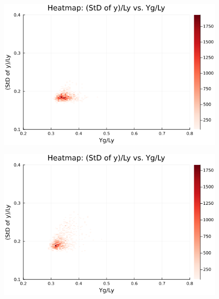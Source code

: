 \begin{figure}[H]
  \centering
  \includegraphics[scale=0.6]{image/RaRtmap10_heat/2023-12-28T12:38:52.686_map_10times_chi1.265_Ay50_rho0.4_T0.43_dT0.04_Rd0.0_Rt0.5_Ra0.0_g0.0003999718779659611_run4.0e8.png}
  \label{}
\end{figure}

\begin{figure}[H]
  \centering
  \includegraphics[scale=0.6]{image/RaRtmap10_heat/2023-12-28T12:38:52.752_map_10times_chi1.265_Ay50_rho0.4_T0.43_dT0.04_Rd0.0_Rt0.5_Ra0.4693845_g0.0003999718779659611_run4.0e8.png}
  \label{}
\end{figure}

